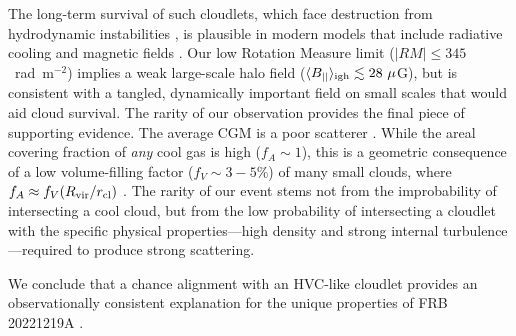 \documentclass[twocolumn, linenumbers, tra]{aastex631}
\newcommand{\nihari}{FRB\,20221219A } %
\begin{document}
The long-term survival of such cloudlets, which face destruction from hydrodynamic instabilities \citep{Klein1994}, is plausible in modern models that include radiative cooling and magnetic fields \citep{Gronke2022, Sparre2019}. Our low Rotation Measure limit ($|RM| \le 345$~rad~m$^{-2}$) implies a weak large-scale halo field ($\langle B_{||} \rangle_{\rm igh} \lesssim 28~\mu$G), but is consistent with a tangled, dynamically important field on small scales that would aid cloud survival. The rarity of our observation provides the final piece of supporting evidence. The average CGM is a poor scatterer \citep{Prochaska2019b, Connor2022}. While the areal covering fraction of \textit{any} cool gas is high ($f_A \sim 1$), this is a geometric consequence of a low volume-filling factor ($f_V \sim 3-5\%$) of many small clouds, where $f_A \approx f_V (R_{\rm vir}/r_{\rm cl})$ \citep{Stocke2013}. The rarity of our event stems not from the improbability of intersecting a cool cloud, but from the low probability of intersecting a cloudlet with the specific physical properties---high density and strong internal turbulence---required to produce strong scattering.

We conclude that a chance alignment with an HVC-like cloudlet provides an observationally consistent explanation for the unique properties of \nihari.


\end{document}

